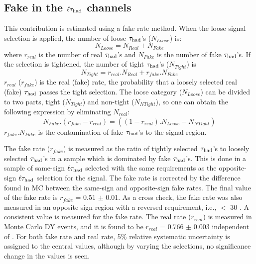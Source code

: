 \subsection{\texorpdfstring{Fake \Tau in the $\ell\tau_{\rm had}$ channels}{Fake tau the in lepton-tau channels}}
\label{sect:bkgFake}
This contribution is estimated using a fake rate method.
When the loose signal selection is applied, the number of loose $\tau_{\rm had}$'s ($N_{Loose}$) is:
\begin{equation}
N_{Loose} = N_{Real} + N_{Fake}
\end{equation}
where $r_{real}$ is the number of real $\tau_{\rm had}$'s and $N_{Fake}$ is the number of fake 
$\tau_{\rm had}$'s. If the selection is tightened, the number of tight $\tau_{\rm had}$'s ($N_{Tight}$) is
\begin{equation}
 N_{Tight} = r_{real}.N_{Real} + r_{fake}.N_{Fake}
\end{equation} 
$r_{real}$ ($r_{fake}$) is the real (fake) rate, the probability that a loosely selected real (fake) $\tau_{\rm had}$ passes the  tight  selection. 
The loose category ($N_{Loose}$) can be divided to two parts, 
tight ($N_{Tight}$) and non-tight ($N_{NTight}$), so one can obtain the following expression by eliminating $N_{real}$:
\begin{equation}
   N_{Fake}.(r_{fake}-r_{real}) = ((1 - r_{real}).N_{Loose}  - N_{NTight})
\end{equation}
$r_{fake}$.$N_{Fake}$ is the contamination of fake $\tau_{\rm had}$'s to the signal region. 

The fake rate ($r_{fake}$) is measured as the ratio of tightly selected $\tau_{\rm had}$'s to loosely 
selected $\tau_{\rm had}$'s in a sample which is dominated by fake $\tau_{\rm had}$'s. This is done in a sample of same-sign $\ell\tau_{\rm had}$ selected 
with the same requirements as the opposite-sign $\ell\tau_{\rm had}$
selection for the signal.
The fake rate is corrected by the difference found in MC between the 
same-sign and opposite-sign fake rates.
The final value of the fake rate is $r_{fake}$ = 0.51 $\pm$ 0.01. 
As a cross check, the fake rate was also measured in an opposite sign region with a reversed
\MPT requirement, i.e., \MPT $<$ 30 \GeV.
A consistent value is measured for the fake rate.  
The real rate ($r_{real}$) is measured in Monte Carlo DY events, and it is found to 
be $r_{real}$ = 0.766 $\pm$ 0.003 independent of \mttwo. 
For both fake rate and real rate, 5\% relative systematic uncertainty is assigned to the central values, although 
by varying the selections, no significance change in the values is seen.

